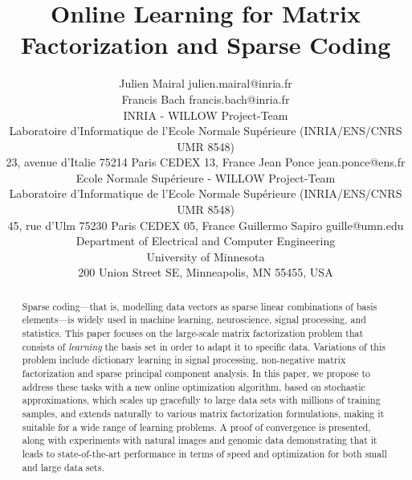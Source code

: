\documentclass[twoside,11pt]{article}
\begin{document}
\title{Online Learning for Matrix Factorization and Sparse Coding}

\author{\name Julien Mairal \email julien.mairal@inria.fr \\
        \name Francis Bach \email francis.bach@inria.fr \\
        \addr INRIA - WILLOW Project-Team\\
         Laboratoire d'Informatique de l'Ecole Normale Sup\'erieure (INRIA/ENS/CNRS UMR 8548)\\
         23, avenue d'Italie 75214 Paris CEDEX 13, France \AND
        \name Jean Ponce \email jean.ponce@ens.fr \\
        \addr Ecole Normale Sup\'erieure - WILLOW Project-Team\\
        Laboratoire d'Informatique de l'Ecole Normale Sup\'erieure (INRIA/ENS/CNRS UMR 8548)\\
        45, rue d'Ulm 75230 Paris CEDEX 05, France  \AND
        \name Guillermo Sapiro \email guille@umn.edu \\
        \addr Department of Electrical and Computer Engineering \\
        University of Minnesota \\
        200 Union Street SE, Minneapolis, MN 55455, USA}


\editor{~}


\maketitle
\begin{abstract}%
   Sparse coding---that is, modelling data vectors as sparse linear
   combinations of basis elements---is widely used in machine learning,
   neuroscience, signal processing, and statistics. This paper focuses on the
   large-scale matrix factorization problem that consists of {\em learning}
   the basis set in order to adapt it to specific data. Variations of this
   problem include dictionary learning in signal processing, non-negative
   matrix factorization and sparse principal component analysis. In this
   paper, we propose to address these tasks with a new online optimization
   algorithm, based on stochastic approximations, which scales up gracefully
   to large data sets with millions of training samples, and extends naturally
   to various  matrix factorization formulations, making it suitable for a
   wide range of learning problems. A proof of convergence is presented,
   along with experiments with natural images and genomic data demonstrating
   that it leads to state-of-the-art performance in terms of speed and
   optimization for both small and large data sets.
\end{abstract}
\end{document}
